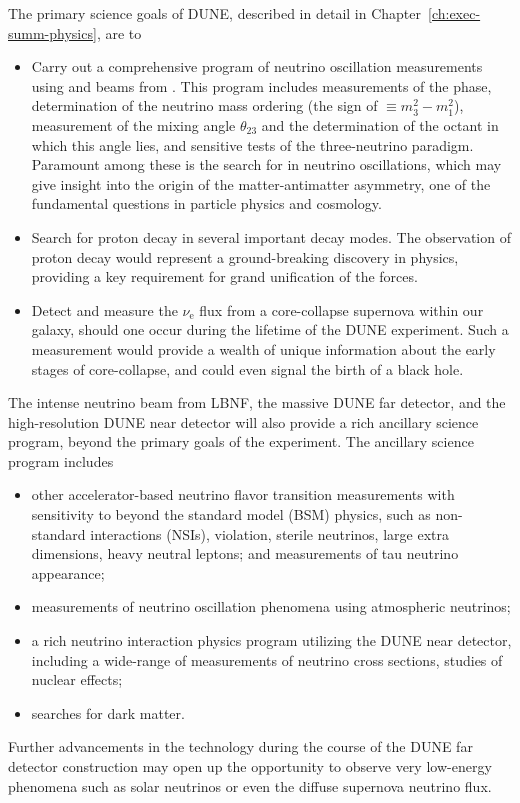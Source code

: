 The primary science goals of DUNE, described in detail in Chapter~\ref{ch:exec-summ-physics}, are to
\begin{itemize}

\item Carry out a comprehensive program of neutrino oscillation measurements using \numu and \anumu beams from \fnal. This program includes measurements of the  phase, determination of the neutrino mass ordering (the sign of $ \equiv m_3^2-m_1^2$), measurement of the mixing angle $\theta_{23}$ and the determination of the octant in which this angle lies,
and sensitive tests of the three-neutrino paradigm. Paramount among these is the search for  in neutrino oscillations, which may give insight into the origin of the matter-antimatter asymmetry, one of the fundamental questions in particle physics and cosmology. 

\item Search for proton decay in several important decay modes. The observation of proton decay would represent a ground-breaking discovery in physics, providing a key requirement for grand unification of the forces. 

    \item Detect and measure the $\nu_\text{e}$ flux from a core-collapse supernova within our galaxy, should one occur during the lifetime of the DUNE experiment. Such a measurement would provide a wealth of unique information about the early stages of core-collapse, and could even signal the birth of a black hole.
    
\end{itemize}

The intense neutrino beam from LBNF, the massive DUNE \lartpc far detector, and the high-resolution
DUNE near detector will also provide a rich ancillary science program, beyond the primary goals of the experiment. The ancillary science program includes
\begin{itemize}
     \item other accelerator-based neutrino flavor transition measurements with sensitivity to beyond the standard model (BSM) physics, such as non-standard interactions (NSIs),  violation, sterile neutrinos, large extra dimensions, heavy neutral leptons;
 and measurements of tau neutrino appearance;
     \item measurements of neutrino oscillation phenomena using atmospheric neutrinos;
     \item a rich neutrino interaction physics program utilizing the DUNE near detector, including a wide-range of measurements of neutrino cross sections, studies of nuclear effects; %
     \item  searches for dark matter.
\end{itemize} 
Further advancements in the \lartpc %
technology during the course of the DUNE far detector construction may open up the opportunity
to observe very low-energy phenomena such as solar neutrinos or even the diffuse supernova neutrino flux.


